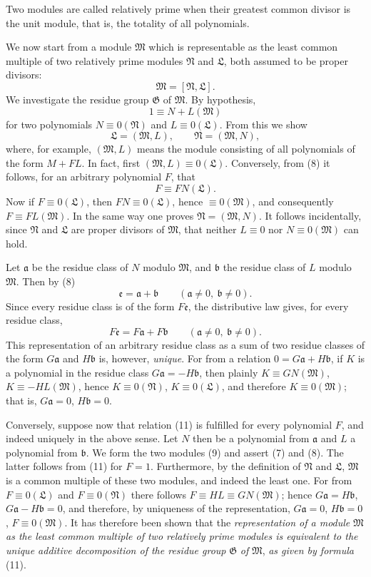 \documentclass[11pt]{article}
\newcommand{\mM}{\mathfrak{M}}
\newcommand{\mN}{\mathfrak{N}}
\newcommand{\mL}{\mathfrak{L}}
\newcommand{\mG}{\mathfrak{G}}
\newcommand{\ma}{\mathfrak{a}}
\newcommand{\mb}{\mathfrak{b}}
\newcommand{\me}{\mathfrak{e}}
\begin{document}
Two modules are called relatively prime when their greatest common divisor is the unit module, that is, the totality of all polynomials.

We now start from a module $\mM$ which is representable as the least common multiple of two relatively prime modules $\mN$ and $\mL$, both assumed to be proper divisors:
\begin{equation}
 \mM=[\mN,\mL].
\tag{7}
\end{equation}
We investigate the residue group $\mG$ of $\mM$. By hypothesis,
\begin{equation}
 1\equiv N+L(\mM)
\tag{8}
\end{equation}
for two polynomials $N\equiv0(\mN)$ and $L\equiv0(\mL)$. From this we show
\begin{equation}
 \mL=(\mM,L),\qquad \mN=(\mM,N),
\tag{9}
\end{equation}
where, for example, $(\mM,L)$ means the module consisting of all polynomials of the form $M+FL$. In fact, first $(\mM,L)\equiv0(\mL)$. Conversely, from (8) it follows, for an arbitrary polynomial $F$, that
\begin{equation}
 F\equiv FN(\mL).
\tag{10}
\end{equation}
Now if $F\equiv0(\mL)$, then $FN\equiv0(\mL)$, hence $\equiv0(\mM)$, and consequently $F\equiv FL(\mM)$. In the same way one proves $\mN=(\mM,N)$. It follows incidentally, since $\mN$ and $\mL$ are proper divisors of $\mM$, that neither $L\equiv0$ nor $N\equiv0(\mM)$ can hold.

Let $\ma$ be the residue class of $N$ modulo $\mM$, and $\mb$ the residue class of $L$ modulo $\mM$. Then by (8)
\[
 \me=\ma+\mb\qquad(\ma\ne0,\ \mb\ne0).
\]
Since every residue class is of the form $F\me$, the distributive law gives, for every residue class,
\begin{equation}
 F\me=F\ma+F\mb\qquad(\ma\ne0,\ \mb\ne0).
\tag{11}
\end{equation}
This representation of an arbitrary residue class as a sum of two residue classes of the form $G\ma$ and $H\mb$ is, however, \emph{unique}. For from a relation $0=G\ma+H\mb$, if $K$ is a polynomial in the residue class $G\ma=-H\mb$, then plainly $K\equiv GN(\mM)$, $K\equiv-HL(\mM)$, hence $K\equiv0(\mN)$, $K\equiv0(\mL)$, and therefore $K\equiv0(\mM)$; that is, $G\ma=0$, $H\mb=0$.

Conversely, suppose now that relation (11) is fulfilled for every polynomial $F$, and indeed uniquely in the above sense. Let $N$ then be a polynomial from $\ma$ and $L$ a polynomial from $\mb$. We form the two modules (9) and assert (7) and (8). The latter follows from (11) for $F=1$. Furthermore, by the definition of $\mN$ and $\mL$, $\mM$ is a common multiple of these two modules, and indeed the least one. For from $F\equiv0(\mL)$ and $F\equiv0(\mN)$ there follows $F\equiv HL\equiv GN(\mM)$; hence $G\ma=H\mb$, $G\ma-H\mb=0$, and therefore, by uniqueness of the representation, $G\ma=0$, $H\mb=0$, $F\equiv0(\mM)$. It has therefore been shown that the \emph{representation of a module} $\mM$ \emph{as the least common multiple of two relatively prime modules is equivalent to the unique additive decomposition of the residue group} $\mG$ \emph{of} $\mM$, \emph{as given by formula} (11).
\end{document}
